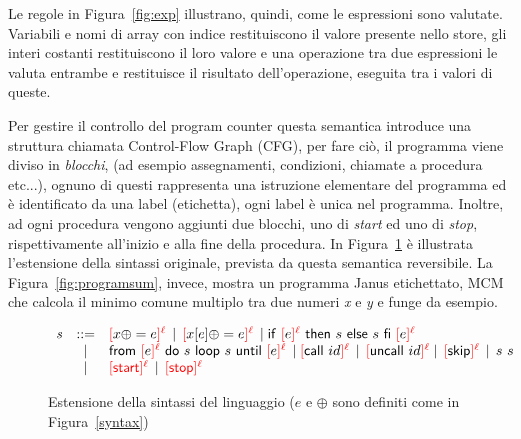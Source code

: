 \documentclass{article}
\theoremstyle{plain}
\theoremstyle{definition}
\theoremstyle{plain}
\newcommand{\mi}[1]{\mathit{#1}}
\newcommand{\ms}[1]{\mathsf{#1}}
\newcommand{\red}[1]{\textcolor{red}{#1}}
\begin{document}
Le regole in Figura~\ref{fig:exp} illustrano, quindi, come le espressioni sono valutate. Variabili e nomi di array con indice restituiscono il valore presente nello store, gli interi costanti restituiscono il loro valore e una operazione tra due espressioni le valuta entrambe e restituisce il risultato dell'operazione, eseguita tra i valori di queste.
\bigskip

Per gestire il controllo del program counter questa semantica introduce una struttura chiamata Control-Flow Graph (CFG), per fare ciò, il programma viene diviso in \emph{blocchi}, (ad esempio assegnamenti, condizioni, chiamate a procedura etc...), ognuno di questi rappresenta una istruzione elementare del programma ed è identificato da una label (etichetta), ogni label è unica nel programma. Inoltre, ad ogni procedura vengono aggiunti due blocchi, uno di \emph{start} ed uno di \emph{stop}, rispettivamente all'inizio e alla fine della procedura. In Figura~\ref{fig:labeled-syntax} è illustrata l'estensione della sintassi originale, prevista da questa semantica reversibile. La Figura~\ref{fig:programsum}, invece, mostra un programma Janus etichettato, MCM che calcola il minimo comune multiplo tra due numeri \emph{x} e \emph{y} e funge da esempio.

\begin{figure}[h]
\small
\begin{center}
$
\begin{array}{rcl@{~~~~~~}rcl@{ }}
\mi{s} & ::= & \red{[}x \oplus = e\red{]^\ell} \, \mid \, 
\red{[}x[e]\oplus=e\red{]^\ell} \,
\mid 
\ms{if}~\red{[}e\red{]^\ell} ~\ms{then} ~s~\ms{else}~s~\ms{fi}~
\red{[}e\red{]^\ell} \\
& \mid & 
\ms{from}~\red{[}e\red{]^\ell}~\ms{do}~s~\ms{loop}~s~\ms{until}~\red{[}e\red{]^\ell} \,
\mid 
\red{[} \ms{call}~id\red{]^\ell} \, \mid \, 
\red{[} \ms{uncall}~id\red{]^\ell} \mid \, 
\red{[} \ms{skip}\red{]^\ell} \, \mid \, s~s\\
& \mid & \red{[\ms{start}]^\ell} \, \mid \, \red{[\ms{stop}]^\ell} %
\end{array}
$
\end{center}
\caption{Estensione della sintassi del linguaggio ($\mi{e}$ e $\oplus$ sono definiti come in Figura~\ref{syntax})} \label{fig:labeled-syntax}
\end{figure}
\end{document}
